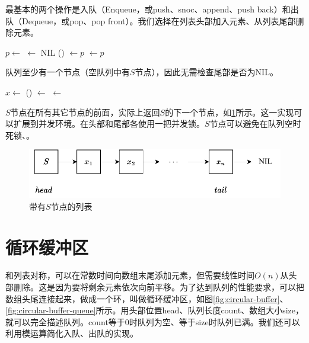 \documentclass[b5paper]{ctexart}
\begin{document}
最基本的两个操作是入队（Enqueue，或push、snoc、append、push back）和出队（Dequeue，或pop、pop front）。我们选择在列表头部加入元素、从列表尾部删除元素。

\begin{algorithmic}[1]
  \State $p \gets $ 
  \State {} $\gets$ NIL
  \State {}() $\gets p$
  \State {} $\gets p$
\EndFunction
\end{algorithmic}

队列至少有一个节点（空队列中有$S$节点），因此无需检查尾部是否为NIL。

\begin{algorithmic}[1]
  \State $x \gets $ 
  \State {}() $\gets$ 
   
    \State {} $\gets$ 
  \EndIf
  \State \Return {}
\EndFunction
\end{algorithmic}

$S$节点在所有其它节点的前面，实际上返回$S$的下一个节点，如\cref{fig:list-queue}所示。这一实现可以扩展到并发环境。在头部和尾部各使用一把并发锁。$S$节点可以避免在队列空时死锁\cite{PODC96}、\cite{SutterDDJ}。

\begin{figure}[htbp]
  \centering
  \includegraphics[scale=0.8]{img/slistq}
  \caption{带有$S$节点的列表}
  \label{fig:list-queue}
\end{figure}

\section{循环缓冲区}

和列表对称，可以在常数时间向数组末尾添加元素，但需要线性时间$O(n)$从头部删除。这是因为要将剩余元素依次向前平移。为了达到队列的性能要求，可以把数组头尾连接起来，做成一个环，叫做循环缓冲区，如图\cref{fig:circular-buffer}、\cref{fig:circular-buffer-queue}所示。用头部位置head、队列长度count、数组大小size，就可以完全描述队列。count等于0时队列为空、等于size时队列已满。我们还可以利用模运算简化入队、出队的实现。
\end{document}
